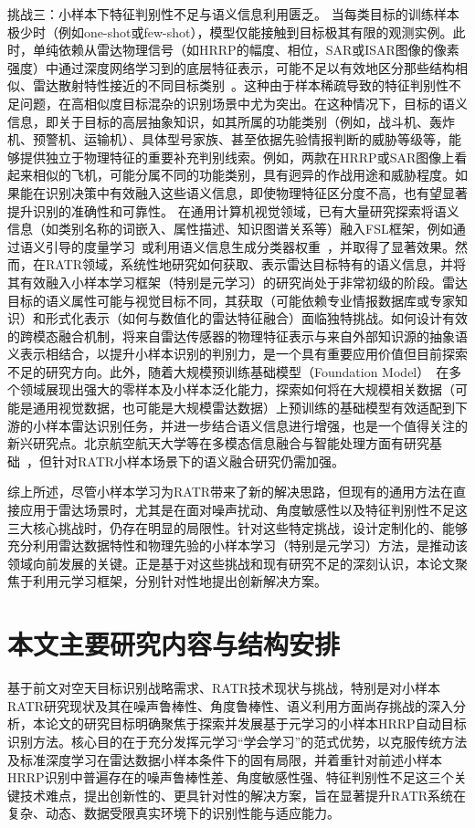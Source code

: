{{挑战三：小样本下特征判别性不足与语义信息利用匮乏。}
当每类目标的训练样本极少时（例如one-shot或few-shot），模型仅能接触到目标极其有限的观测实例。此时，单纯依赖从雷达物理信号（如HRRP的幅度、相位，SAR或ISAR图像的像素强度）中通过深度网络学习到的底层特征表示，可能不足以有效地区分那些结构相似、雷达散射特性接近的不同目标类别~\cite{X}。这种由于样本稀疏导致的{特征判别性不足}问题，在高相似度目标混杂的识别场景中尤为突出。在这种情况下，目标的{语义信息}，即关于目标的高层抽象知识，如其所属的功能类别（例如，战斗机、轰炸机、预警机、运输机）、具体型号家族、甚至依据先验情报判断的威胁等级等，能够提供独立于物理特征的重要补充判别线索。例如，两款在HRRP或SAR图像上看起来相似的飞机，可能分属不同的功能类别，具有迥异的作战用途和威胁程度。如果能在识别决策中有效融入这些语义信息，即使物理特征区分度不高，也有望显著提升识别的准确性和可靠性。
在通用计算机视觉领域，已有大量研究探索将语义信息（如类别名称的词嵌入、属性描述、知识图谱关系等）融入FSL框架，例如通过语义引导的度量学习~\cite{X}或利用语义信息生成分类器权重~\cite{X}，并取得了显著效果。然而，在RATR领域，系统性地研究如何获取、表示雷达目标特有的语义信息，并将其有效融入小样本学习框架（特别是元学习）的研究尚处于非常初级的阶段。雷达目标的语义属性可能与视觉目标不同，其获取（可能依赖专业情报数据库或专家知识）和形式化表示（如何与数值化的雷达特征融合）面临独特挑战。如何设计有效的{跨模态融合机制}，将来自雷达传感器的物理特征表示与来自外部知识源的抽象语义表示相结合，以提升小样本识别的判别力，是一个具有重要应用价值但目前探索不足的研究方向。此外，随着大规模预训练{基础模型（Foundation Model）}~\cite{X}在多个领域展现出强大的零样本及小样本泛化能力，探索如何将在大规模相关数据（可能是通用视觉数据，也可能是大规模雷达数据）上预训练的基础模型有效适配到下游的小样本雷达识别任务，并进一步结合语义信息进行增强，也是一个值得关注的新兴研究点。北京航空航天大学等在多模态信息融合与智能处理方面有研究基础~\cite{X}，但针对RATR小样本场景下的语义融合研究仍需加强。

综上所述，尽管小样本学习为RATR带来了新的解决思路，但现有的通用方法在直接应用于雷达场景时，尤其是在面对噪声扰动、角度敏感性以及特征判别性不足这三大核心挑战时，仍存在明显的局限性。针对这些特定挑战，设计定制化的、能够充分利用雷达数据特性和物理先验的小样本学习（特别是元学习）方法，是推动该领域向前发展的关键。正是基于对这些挑战和现有研究不足的深刻认识，本论文聚焦于利用元学习框架，分别针对性地提出创新解决方案。

\section{本文主要研究内容与结构安排}
基于前文对空天目标识别战略需求、RATR技术现状与挑战，特别是对小样本RATR研究现状及其在噪声鲁棒性、角度鲁棒性、语义利用方面尚存挑战的深入分析，本论文的研究目标明确聚焦于探索并发展基于元学习的小样本HRRP自动目标识别方法。核心目的在于充分发挥元学习“学会学习”的范式优势，以克服传统方法及标准深度学习在雷达数据小样本条件下的固有局限，并着重针对前述小样本HRRP识别中普遍存在的{噪声鲁棒性差、角度敏感性强、特征判别性不足}这三个关键技术难点，提出创新性的、更具针对性的解决方案，旨在显著提升RATR系统在复杂、动态、数据受限真实环境下的识别性能与适应能力。

}
